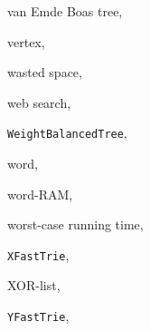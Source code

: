 \documentclass[10pt]{book}
\theoremstyle{plain}
\theoremstyle{definition}
\begin{document}
\begin{theindex}
  \indexspace

  \item van Emde Boas tree, 
  \item vertex, 

  \indexspace

  \item wasted space, 
  \item web search, 
  \item \texttt{WeightBalancedTree}, 
  \item word, 
  \item word-RAM, 
  \item worst-case running time, 

  \indexspace

  \item \texttt{XFastTrie}, 
  \item XOR-list, 

  \indexspace

  \item \texttt{YFastTrie}, 

\end{theindex}
\end{document}

